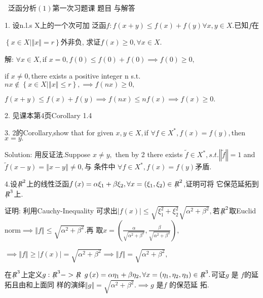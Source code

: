 \documentclass{ctexart}
\begin{document}
\bigskip\ 
泛函分析$\left(
1\right) $第一次习题课 题目%
与解答

1. 设n.l.s X上的一个次可加%
泛函$f:f(x+y)\leq f\left( x\right) +f\left( y\right) \forall
x,y\in X.$已知$f$在

$\left\{ x\in X|\left\Vert x\right\Vert =r\right\} $外非负,%
求证$f\left( x\right) \geq 0,\forall x\in X.$

解: $\forall x\in X,$if $x=0,f\left( 0\right) \leq f\left( 0\right)
+f\left( 0\right) \implies f\left( 0\right) \geq 0,$

if $x\neq 0,$there exists a positive integer n s.t. $nx\notin \left\{ x\in
X|\left\Vert x\right\Vert \leq r\right\} ,\implies f\left( nx\right) \geq 0,$

$f(x+y)\leq f\left( x\right) +f\left( y\right) \implies f\left( nx\right)
\leq nf\left( x\right) \implies f\left( x\right) \geq 0.$

2. 见课本第4页Corollary 1.4

3. 2的Corollary,show that for given $x,y\in X,$if $\forall f\in
X^{\ast },f\left( x\right) =f\left( y\right) ,$then $x=y.$

Solution: 用反证法.Suppose $x\neq y,$ then by 2
there exists $\tilde{f}\in X^{\ast },s.t.\left\Vert \tilde{f}\right\Vert =1$
and $\tilde{f}\left( x-y\right) =\left\Vert x-y\right\Vert \neq 0,$与%
条件中 $\forall f\in X^{\ast },f\left( x\right) =f\left(
y\right) $矛盾.

4.设$\NEG{R}^{2}$上的线性泛函$%
f\left( x\right) =\alpha \xi _{1}+\beta \xi _{2},\forall x=\left( \xi
_{1},\xi _{2}\right) \in \NEG{R}^{2}$,证明可将%
它保范延拓到$\NEG{R}^{3}$上.

证明: 利用Cauchy-Inequality 可求出$%
\left\vert f\left( x\right) \right\vert \leq \sqrt{\xi _{1}^{2}+\xi _{2}^{2}}%
\sqrt{\alpha ^{2}+\beta ^{2}},$若$\NEG{R}^{2}$取Euclid norm$%
\implies \left\Vert f\right\Vert \leq \sqrt{\alpha ^{2}+\beta ^{2}}.$再%
取$x=\left( \frac{\alpha }{\sqrt{\alpha ^{2}+\beta ^{2}}},\frac{\beta 
}{\sqrt{\alpha ^{2}+\beta ^{2}}}\right) ,$

$\implies \left\Vert f\right\Vert \geq \left\vert f\left( x\right)
\right\vert =\sqrt{\alpha ^{2}+\beta ^{2}}\implies \left\Vert f\right\Vert =%
\sqrt{\alpha ^{2}+\beta ^{2}},$

在$\NEG{R}^{3}$上定义$g:\NEG{R}^{3}->\NEG{R}$ $%
g\left( x\right) =\alpha \eta _{1}+\beta \eta _{2},\forall x=\left( \eta
_{1},\eta _{2},\eta _{3}\right) \in \NEG{R}^{3}.$可证$g$ 是%
$f$的延拓且由和上面同%
样的演绎$\left\Vert g\right\Vert =\sqrt{\alpha
^{2}+\beta ^{2}}.\implies g$ 是$f$ 的保范延%
拓.
\end{document}
